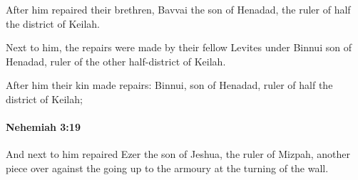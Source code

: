 			\begin{versebox}
					\item[BHS] 
					\item[LXX] 
					\item[ASV] After him repaired their brethren, Bavvai the son of Henadad, the ruler of half the district of Keilah.
					\item[NIV] Next to him, the repairs were made by their fellow Levites under Binnui son of Henadad, ruler of the other half-district of Keilah.
					\item[NRSV] After him their kin made repairs: Binnui, son of Henadad, ruler of half the district of Keilah;
			\end{versebox}

		\paragraph{Nehemiah 3:19} %
			\label{NEHEMIAH-3-19}

			And next to him repaired Ezer the son of Jeshua, the ruler of Mizpah, another piece over against the going up to the armoury at the turning of the wall.

